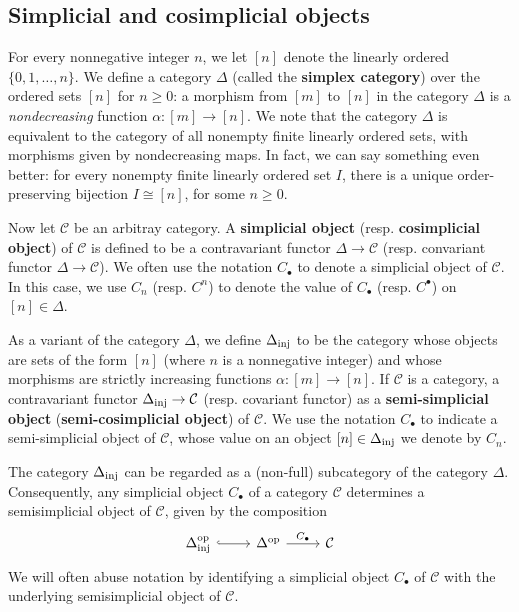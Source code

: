 \subsection{Simplicial and cosimplicial objects}
For every nonnegative integer $n$, we let $[n]$ denote the linearly ordered $\{0,1,\dots,n\}$. We define a category $\Delta$ (called the \textbf{simplex category}) over the ordered sets $[n]$ for $n\geq 0$: a morphism from $[m]$ to $[n]$ in the category $\Delta$ is a \textit{nondecreasing} function $\alpha:[m]\to[n]$. We note that the category $\Delta$ is equivalent to the category of all nonempty finite linearly ordered sets, with morphisms given by nondecreasing maps. In fact, we can say something even better: for every nonempty finite linearly ordered set $I$, there is a unique order-preserving bijection $I\cong[n]$, for some $n\geq 0$.\par
Now let $\mathcal{C}$ be an arbitray category. A \textbf{simplicial object} (resp. \textbf{cosimplicial object}) of $\mathcal{C}$ is defined to be a contravariant functor $\Delta\to\mathcal{C}$ (resp. convariant functor $\Delta\to\mathcal{C}$). We often use the notation $C_\bullet$ to denote a simplicial object of $\mathcal{C}$. In this case, we use $C_n$ (resp. $C^n$) to denote the value of $C_\bullet$ (resp. $C^\bullet$) on $[n]\in\Delta$.\par
As a variant of the category $\Delta$, we define $\Delta_{\mathrm{inj}}$ to be the category whose objects are sets of the form $[n]$ (where $n$ is a nonnegative integer) and whose morphisms are strictly increasing functions $\alpha:[m]\to[n]$. If $\mathcal{C}$ is a category, a contravariant functor $\Delta_{\mathrm{inj}}\to\mathcal{C}$ (resp. covariant functor) as a \textbf{semi-simplicial object} (\textbf{semi-cosimplicial object}) of $\mathcal{C}$. We use the notation $C_\bullet$ to indicate a semi-simplicial object of $\mathcal{C}$, whose value on an object $[n]\in\Delta_{\mathrm{inj}}$ we denote by $C_n$.
\begin{remark}
The category $\Delta_{\mathrm{inj}}$ can be regarded as a (non-full) subcategory of the category $\Delta$. Consequently, any simplicial object $C_\bullet$ of a category $\mathcal{C}$ determines a semisimplicial object of $\mathcal{C}$, given by the composition
\[\begin{tikzcd}
\Delta_{\inj}^{\op}\ar[r,hook]&\Delta^{\op}\ar[r,"C_\bullet"]&\mathcal{C}
\end{tikzcd}
\]
We will often abuse notation by identifying a simplicial object $C_\bullet$ of $\mathcal{C}$ with the underlying semisimplicial object of $\mathcal{C}$.
\end{remark}
